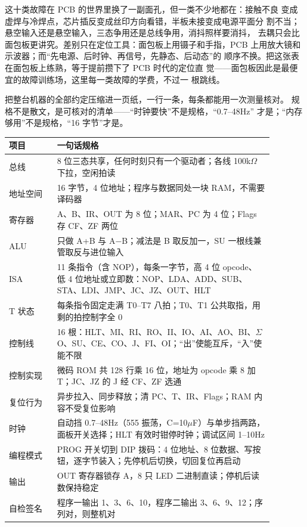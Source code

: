 这十类故障在 PCB 的世界里换了一副面孔，但一类不少地都在：接触不良
变成虚焊与冷焊点，芯片插反变成丝印方向看错，半板未接变成电源平面分
割不当；悬空输入还是悬空输入，三态争用还是总线争用，消抖照样要消抖，
去耦只会比面包板更讲究。差别只在定位工具：面包板上用镊子和手指，PCB
上用放大镜和示波器；而“先电源、后时钟、再信号，先静态、后动态”的
顺序不换。把这张表在面包板上练熟，等于提前攒下了 PCB 时代的定位直
觉——面包板因此是最便宜的故障训练场，这里每一类故障的学费，不过一
根跳线。

把整台机器的全部约定压缩进一页纸，一行一条，每条都能用一次测量核对。
规格不是散文，是可核对的清单——“时钟要快”不是规格，“0.7--48Hz”
才是；“内存够用”不是规格，“16 字节”才是。

\begin{longtable}{L{0.16\linewidth}L{0.72\linewidth}}
\toprule
项目 & 一句话规格 \\
\midrule
总线 & 8 位三态共享，任何时刻只有一个驱动者；各线 100k$\Omega$ 下拉，空闲拍读  \\
地址空间 & 16 字节，4 位地址；程序与数据同处一块 RAM，不需要译码器 \\
寄存器 & A、B、IR、OUT 为 8 位；MAR、PC 为 4 位；Flags 存 CF、ZF 两位 \\
ALU & 只做 A+B 与 A$-$B；减法是 B 取反加一，SU 一根线兼管取反与进位输入 \\
ISA & 11 条指令（含 NOP），每条一字节，高 4 位 opcode、低 4 位地址或立即数：NOP、LDA、ADD、SUB、STA、LDI、JMP、JC、JZ、OUT、HLT \\
T 状态 & 每条指令固定走满 T0--T7 八拍；T0、T1 公共取指，用剩的拍控制字全 0 \\
控制线 & 16 根：HLT、MI、RI、RO、II、IO、AI、AO、BI、$\Sigma$O、SU、CE、CO、J、FI、OI；“出”使能互斥，“入”使能不限 \\
控制实现 & 微码 ROM 共 128 行乘 16 位，地址为 opcode 乘 8 加 T；JC、JZ 的 J 经 CF、ZF 选通 \\
复位行为 & 异步拉入、同步释放；清 PC、T、IR、Flags；RAM 内容不受复位影响 \\
时钟 & 自动挡 0.7--48Hz（555 振荡，C=10$\mu$F）与单步挡两路，面板开关选择；HLT 有效时钳停时钟；调试区间 1--10Hz \\
编程模式 & PROG 开关切到 DIP 拨码：4 位地址、8 位数据、写按钮，逐字节装入；先停机后切换，切回复位再启动 \\
输出 & OUT 寄存器锁存 A，8 只 LED 二进制直读；停机后读数保持稳定 \\
自检签名 & 程序一输出 1、3、6、10，程序二输出 3、6、9、12；序列对，则整机对 \\
\bottomrule
\end{longtable}

